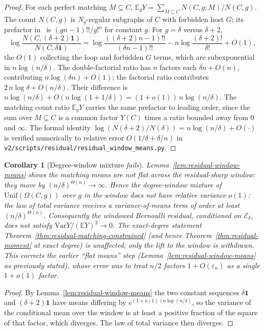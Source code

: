 \documentclass[11pt]{article}
\newtheorem{corollary}[theorem]{Corollary}
\newcommand{\EE}{\mathbb{E}}
\newcommand{\Var}{\mathrm{Var}}
\begin{document}
\begin{proof}
For each perfect matching \(M\subseteq C\), \(\EE_gY=\sum_{M\subseteq C}N(C,g;M)/N(C,g)\).
The count \(N(C,g)\) is \(N_g\)-regular subgraphs of \(C\) with forbidden host \(G\);
its prefactor in~\cite[Theorem~4.6]{McK85} is \((g n-1)!!/g!^n\) for constant \(g\).
For \(g=\delta\) versus \(\delta+2\),
\[
\log\frac{N(C,(\delta+2)\mathbf 1)}{N(C,\delta\mathbf 1)}
=
\log\frac{((\delta+2)n-1)!!}{(\delta n-1)!!}
-n\log\frac{(\delta+2)!}{\delta!}
+O(1),
\]
the \(O(1)\) collecting the loop and forbidden \(G\) terms, which are subexponential
in \(n\log(n/\delta)\). The double-factorial ratio has \(n\) factors each
\(\delta n+O(n)\), contributing \(n\log(\delta n)+O(1)\); the factorial ratio
contributes \(2\,n\log\delta+O(n/\delta)\). Their difference is
\(n\log(n/\delta)+O(n\log(1+1/\delta))= (1+o(1))\,n\log(n/\delta)\). The matching
count ratio \(\EE_g Y\) carries the same prefactor to leading order, since the
sum over \(M\subseteq C\) is a common factor \(Y(C)\) times a ratio bounded away from
\(0\) and \(\infty\). The formal identity \(\log(N(\delta+2)/N(\delta)) = n\log(n/\delta)+O(\cdot)\)
is verified numerically to relative error \(O(1/\delta + \delta/n)\) in
\texttt{v2/scripts/residual/residual\_window\_means.py}.
\end{proof}

\begin{corollary}[Degree-window mixture \emph{fails}]
\label{cor:residual-matching-window}
Lemma~\ref{lem:residual-window-means} shows the matching means are not flat across
the residual-sharp window: they move by \((n/\delta)^{\Theta(n)}\to\infty\). Hence the
degree-window mixture of \(\mathrm{Unif}(\Omega(C,g))\) over \(g\) in the window does
\emph{not} have relative variance \(o(1)\): the law of total variance receives a
variance-of-means term of order at least \((n/\delta)^{\Theta(n)}\). Consequently the
windowed Bernoulli residual, conditioned on \(\mathcal E_\delta\), does \emph{not}
satisfy \(\Var Y/(\EE Y)^2\to0\). The exact-degree statement
Theorem~\ref{thm:residual-matching-constrained} (and hence
Theorem~\ref{thm:residual-moment} at exact degree) is unaffected; only the lift to the
window is withdrawn. This corrects the earlier ``flat means'' step
(Lemma~\ref{lem:residual-window-means} as previously stated), whose error was to treat
\(n/2\) factors \(1+O(\varepsilon_n)\) as a single \(1+o(1)\) factor.
\end{corollary}

\begin{proof}
By Lemma~\ref{lem:residual-window-means} the two constant sequences \(\delta\mathbf 1\) and
\((\delta+2)\mathbf 1\) have means differing by \(e^{(1+o(1))n\log(n/\delta)}\), so the
variance of the conditional mean over the window is at least a positive fraction of the
square of that factor, which diverges. The law of total variance then diverges.
\end{proof}
\end{document}
